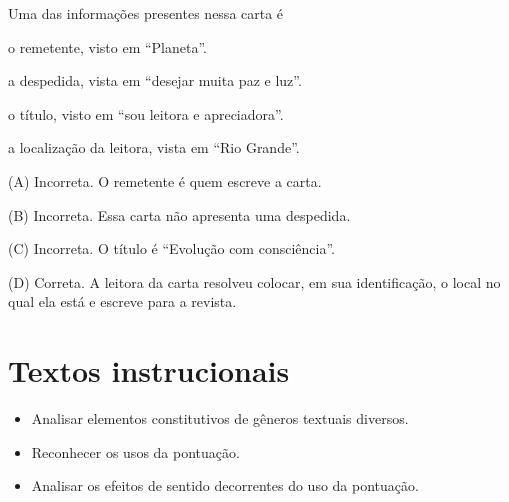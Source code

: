 \begin{escolha}
Uma das informações presentes nessa carta é

\begin{escolha}
\item o remetente, visto em ``Planeta''.

\item a despedida, vista em ``desejar muita paz e luz''.

\item o título, visto em ``sou leitora e apreciadora''.

\item a localização da leitora, vista em ``Rio Grande''.
\end{escolha}


(A) Incorreta. O remetente é quem escreve a carta.

(B) Incorreta. Essa carta não apresenta uma despedida.

(C) Incorreta. O título é ``Evolução com consciência''.

(D) Correta. A leitora da carta resolveu colocar, em sua identificação,
o local no qual ela está e escreve para a revista.

\chapter{Textos instrucionais}



\begin{itemize}
\item Analisar elementos constitutivos de gêneros textuais diversos.

\item Reconhecer os usos da pontuação.

\item Analisar os efeitos de sentido decorrentes do uso da pontuação.
\end{itemize}


\end{escolha}
